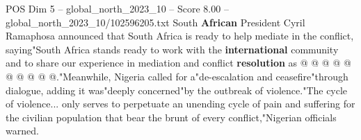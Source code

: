 \begin{textsample}{POS Dim 5 – global\_north\_2023\_10 – Score 8.00 – global\_north\_2023\_10/102596205.txt}
South \textbf{African} President Cyril Ramaphosa announced that South Africa is ready to help mediate in the conflict, saying"South Africa stands ready to work with the \textbf{international} community and to share our experience in mediation and conflict \textbf{resolution} as @ @ @ @ @ @ @ @ @ @."Meanwhile, Nigeria called for a"de-escalation and ceasefire"through dialogue, adding it was"deeply concerned"by the outbreak of violence."The cycle of violence... only serves to perpetuate an unending cycle of pain and suffering for the civilian population that bear the brunt of every conflict,"Nigerian officials warned.

\end{textsample}

